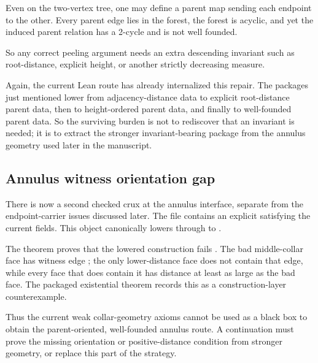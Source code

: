 \documentclass[11pt]{article}
\begin{document}
Even on the two-vertex tree, one may define a parent map sending each endpoint
to the other.  Every parent edge lies in the forest, the forest is acyclic, and
yet the induced parent relation has a 2-cycle and is not well founded.

So any correct peeling argument needs an extra descending invariant such as
root-distance, explicit height, or another strictly decreasing measure.

Again, the current Lean route has already internalized this repair.  The
packages just mentioned lower from adjacency-distance data to explicit
root-distance parent data, then to height-ordered parent data, and finally to
well-founded parent data.  So the surviving burden is not to rediscover that an
invariant is needed; it is to extract the stronger invariant-bearing package
from the annulus geometry used later in the manuscript.

\subsection{Annulus witness orientation gap}

There is now a second checked crux at the annulus interface, separate from the
endpoint-carrier issues discussed later.  The file
 contains an
explicit  satisfying the current
 fields.  This object canonically
lowers through 
to .

The theorem
 proves that the
lowered construction fails
.  The bad
middle-collar face has witness edge ; the only lower-distance face
does not contain that edge, while every face that does contain it has distance
at least as large as the bad face.  The packaged existential theorem
records this as a construction-layer counterexample.

Thus the current weak collar-geometry axioms cannot be used as a black box to
obtain the parent-oriented, well-founded annulus route.  A continuation must
prove the missing orientation or positive-distance condition from stronger
geometry, or replace this part of the strategy.
\end{document}
